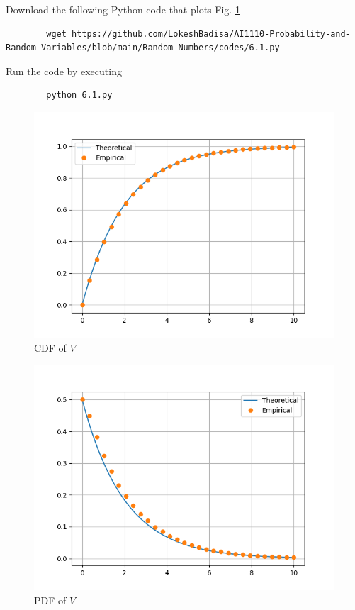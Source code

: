 \documentclass[journal,12pt,twocolumn]{IEEEtran}
\numberwithin{equation}{section}
\renewcommand\thesection{\arabic{section}}
\begin{document}
\begin{enumerate}[label=\thesection.\arabic*,ref=\thesection.\theenumi]
	Download the following Python code that plots Fig. \ref{fig-6.1} 
	\begin{lstlisting}
		wget https://github.com/LokeshBadisa/AI1110-Probability-and-Random-Variables/blob/main/Random-Numbers/codes/6.1.py
	\end{lstlisting}
	Run the code by executing
	\begin{lstlisting}
		python 6.1.py
	\end{lstlisting}
	\begin{figure}
		\centering
		\includegraphics[width=\columnwidth]{./figs/6.1.png}
		\caption{CDF of $V$}
		\label{fig-6.1}
	\end{figure}
	\begin{figure}
		\centering
		\includegraphics[width=\columnwidth]{./figs/6.2.png}
		\caption{PDF of $V$}
		\label{fig-6.2}
	\end{figure}
	

\end{enumerate}
\end{document}
